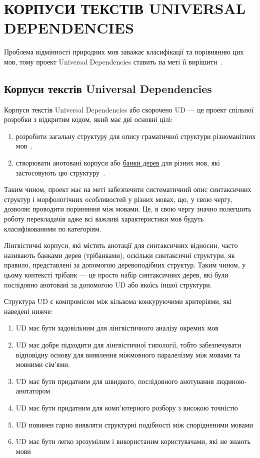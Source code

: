 \section{КОРПУСИ ТЕКСТІВ UNIVERSAL DEPENDENCIES}

Проблема відмінності природних мов заважає класифікації та порівнянню цих мов,
тому проект Universal Dependencies ставить на меті її вирішити~\cite{bib18}.

\subsection{Корпуси текстів Universal Dependencies}
Корпуси текстів Universal Dependencies або скорочено UD — це проект
спільної розробки з відкритим кодом, який має дві основні цілі:

\begin{enumerate}
    \item розробити загальну структуру для опису граматичної структури різноманітних мов~\cite{bib1}.
    \item створювати анотовані корпуси або \hyperlink{term0}{банки дерев} для різних мов,
    які застосовують цю структуру~\cite{bib2}.
\end{enumerate}

Таким чином, проект має на меті забезпечити систематичний опис синтаксичних структур і
морфологічних особливостей у різних мовах, що, у свою чергу, дозволяє проводити порівняння
між мовами. Це, в свою чергу значно полегшить роботу перекладачів
адже всі важливі характеристики мов будуть класифікованими по категоріям.

Лінгвістичні корпуси, які містять анотації для синтаксичних відносин,
часто називають банками дерев (трібанками), оскільки синтаксичні структури, як правило,
представлені за допомогою деревоподібних структур. Таким чином, у цьому контексті трібанк —
це просто набір синтаксичних дерев, які були послідовно анотовані за допомогою UD
або якоїсь іншої структури.

Структура UD є компромісом між кількома конкуруючими критеріями, які наведені нижче:

\begin{enumerate}
    \item UD має бути задовільним для лінгвістичного аналізу окремих мов
    \item UD має добре підходити для лінгвістичної типології, тобто 
    забезпечувати відповідну основу для виявлення міжмовного паралелізму між
    мовами та мовними сім’ями.
    \item UD має бути придатним для швидкого, послідовного анотування людиною-анотатором
    \item UD має бути придатним для комп'ютерного розбору з високою точністю
    \item UD повинен гарно виявляти структурні подібності між спорідненими мовами
    \item UD має бути легко зрозумілим і використаним користувачами, які не знають мови
\end{enumerate}

